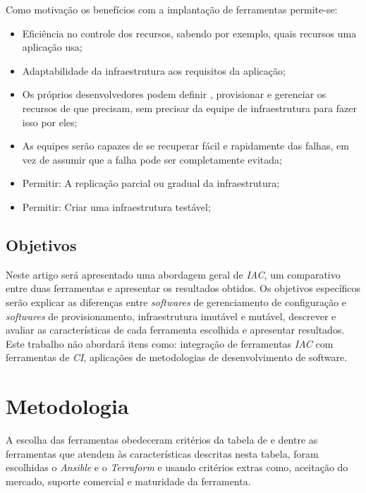   Como motivação os benefícios com a implantação de ferramentas permite-se:  
\begin{itemize}
 \item Eficiência no controle dos recursos, sabendo por exemplo, quais recursos uma aplicação usa;
 \item Adaptabilidade da infraestrutura aos requisitos da aplicação;
 \item Os próprios desenvolvedores podem definir , provisionar e gerenciar os recursos de que precisam, sem precisar da equipe de infraestrutura para fazer isso por eles;

\item As equipes serão capazes de se recuperar fácil e rapidamente das falhas, em vez de assumir que a falha pode ser completamente evitada;

\item Permitir: A replicação parcial ou gradual da infraestrutura;

\item Permitir: Criar uma infraestrutura testável;
\end{itemize} 


\subsection{Objetivos}

Neste artigo será apresentado uma abordagem geral de \textit{IAC}, um comparativo entre duas ferramentas e apresentar os resultados obtidos. Os objetivos específicos serão explicar as diferenças entre \textit{softwares} de gerenciamento de configuração e \textit{softwares} de provisionamento, infraestrutura imutável e mutável, descrever e avaliar as características de cada ferramenta escolhida e apresentar resultados. Este trabalho não abordará itens como: integração de ferramentas \textit{IAC} com ferramentas de \textit{CI}, aplicações de metodologias de desenvolvimento de software. 


\section{\esp Metodologia}

A escolha das ferramentas obedeceram critérios da tabela de  e dentre as ferramentas que atendem às características descritas nesta tabela, foram escolhidas o \textit{Ansible} e o \textit{Terraform} e usando critérios extras como, aceitação do mercado, suporte comercial e maturidade da ferramenta.

